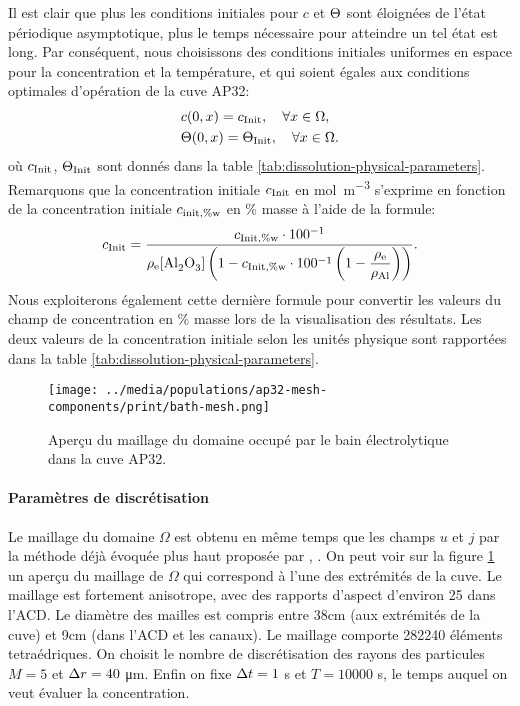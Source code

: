 Il est clair que plus les conditions initiales pour $c$ et
$\Theta$ sont éloignées de l'état périodique
asymptotique, plus le temps nécessaire pour atteindre un tel état est
long. Par conséquent, nous choisissons des conditions initiales
uniformes en espace pour la concentration et la température, et qui
soient égales aux conditions optimales d'opération de la cuve AP32:
\begin{align*}
  & c(0, x) = c_\text{Init},\quad\forall x\in\Omega,\\
  & \Theta(0, x) = \Theta_\text{Init},\quad\forall x\in\Omega.
\end{align*}
où $c_\text{Init}$, $\Theta_\text{Init}$ sont donnés dans la table
\ref{tab:dissolution-physical-parameters}. Remarquons que la
concentration initiale $c_\text{Init}$ en \si{\mol\per\cubic\meter} s'exprime
en fonction de la concentration initiale
$c_{\text{init},\%\mathrm w}$ en \% masse à l'aide de la
formule:
\begin{equation*}
  \cinit = \frac{\cinitwp \cdot
    100^{-1}}{\electrolytedensity[\cee{Al2O3}]\parent{1 - \cinitwp\cdot
      100^{-1}\parent{1 - \displaystyle\frac{\electrolytedensity}{\aluminadensity}}}}.
\end{equation*}
Nous exploiterons également cette dernière formule pour convertir les
valeurs du champ de concentration en \% masse lors de la visualisation
des résultats. Les deux valeurs de la concentration initiale selon les
unités physique sont rapportées dans la table
\ref{tab:dissolution-physical-parameters}.

\begin{figure}[t]
  \begin{center}
    \texttt{[image: ../media/populations/ap32-mesh-components/print/bath-mesh.png]}
    \caption{Aperçu du maillage du domaine occupé par le bain
      électrolytique dans la cuve AP32.}
    \label{fig:bath-mesh}
  \end{center}
\end{figure}

\paragraph{Paramètres de discrétisation}
Le maillage du domaine $\Omega$ est obtenu en même temps que les
champs $u$ et $j$ par la méthode déjà évoquée plus haut proposée par
\cite{Steiner2009}, \cite{Rochat2016}. On peut voir sur la figure
\ref{fig:bath-mesh} un aperçu du maillage de $\Omega$ qui correspond à
l'une des extrémités de la cuve. Le maillage est fortement anisotrope,
avec des rapports d'aspect d'environ \num{25} dans l'ACD. Le diamètre
des mailles est compris entre \num{38}\si{\centi\meter} (aux
extrémités de la cuve) et \num{9}\si{\centi\meter} (dans l'ACD et les
canaux). Le maillage comporte \num{282240} éléments tetraédriques. On
choisit le nombre de discrétisation des rayons des particules $M = 5$
et $\Delta r = \num{40}$ \si{\micro\meter}. Enfin on fixe $\Delta t = 1$
\si{\second} et $T = \num{10000}$ \si{\second}, le temps auquel on
veut évaluer la concentration.


